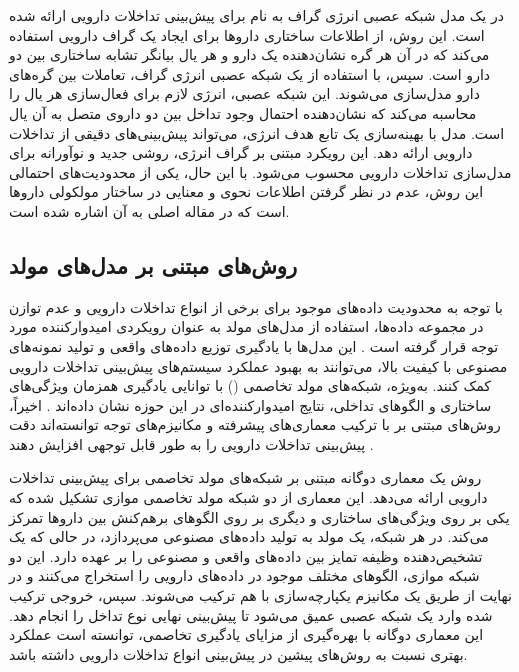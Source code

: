 در \cite{ref_xu2019} یک مدل شبکه عصبی انرژی گراف به نام  برای پیش‌بینی تداخلات دارویی ارائه شده است. این روش، از اطلاعات ساختاری داروها برای ایجاد یک گراف دارویی استفاده می‌کند که در آن هر گره نشان‌دهنده یک دارو و هر یال بیانگر تشابه ساختاری بین دو دارو است. سپس، با استفاده از یک شبکه عصبی انرژی گراف، تعاملات بین گره‌های دارو مدل‌سازی می‌شوند. این شبکه عصبی، انرژی لازم برای فعال‌سازی هر یال را محاسبه می‌کند که نشان‌دهنده احتمال وجود تداخل بین دو داروی متصل به آن یال است. مدل  با بهینه‌سازی یک تابع هدف انرژی، می‌تواند پیش‌بینی‌های دقیقی از تداخلات دارویی ارائه دهد. این رویکرد مبتنی بر گراف انرژی، روشی جدید و نوآورانه برای مدل‌سازی تداخلات دارویی محسوب می‌شود. با این حال، یکی از محدودیت‌های احتمالی این روش، عدم در نظر گرفتن اطلاعات نحوی و معنایی در ساختار مولکولی داروها است که در مقاله اصلی \cite{ref_xu2019} به آن اشاره شده است.


\subsection{روش‌های مبتنی بر مدل‌های مولد}

با توجه به محدودیت داده‌های موجود برای برخی از انواع تداخلات دارویی و عدم توازن در مجموعه داده‌ها، استفاده از مدل‌های مولد به عنوان رویکردی امیدوارکننده مورد توجه قرار گرفته است \cite{ref_yu2023}. این مدل‌ها با یادگیری توزیع داده‌های واقعی و تولید نمونه‌های مصنوعی با کیفیت بالا، می‌توانند به بهبود عملکرد سیستم‌های پیش‌بینی تداخلات دارویی کمک کنند. به‌ویژه، شبکه‌های مولد تخاصمی () با توانایی یادگیری همزمان ویژگی‌های ساختاری و الگوهای تداخلی، نتایج امیدوارکننده‌ای در این حوزه نشان داده‌اند \cite{ref_zhang2024}. اخیراً، روش‌های مبتنی بر  با ترکیب معماری‌های پیشرفته و مکانیزم‌های توجه توانسته‌اند دقت پیش‌بینی تداخلات دارویی را به طور قابل توجهی افزایش دهند \cite{ref_he2023}.

روش  \cite{ref_yu2023} یک معماری دوگانه مبتنی بر شبکه‌های مولد تخاصمی برای پیش‌بینی تداخلات دارویی ارائه می‌دهد. این معماری از دو شبکه مولد تخاصمی موازی تشکیل شده که یکی بر روی ویژگی‌های ساختاری و دیگری بر روی الگوهای برهم‌کنش بین داروها تمرکز می‌کند. در هر شبکه، یک مولد به تولید داده‌های مصنوعی می‌پردازد، در حالی که یک تشخیص‌دهنده وظیفه تمایز بین داده‌های واقعی و مصنوعی را بر عهده دارد. این دو شبکه موازی، الگوهای مختلف موجود در داده‌های دارویی را استخراج می‌کنند و در نهایت از طریق یک مکانیزم یکپارچه‌سازی با هم ترکیب می‌شوند. سپس، خروجی ترکیب شده وارد یک شبکه عصبی عمیق می‌شود تا پیش‌بینی نهایی نوع تداخل را انجام دهد. این معماری دوگانه با بهره‌گیری از مزایای یادگیری تخاصمی، توانسته است عملکرد بهتری نسبت به روش‌های پیشین در پیش‌بینی انواع تداخلات دارویی داشته باشد.

